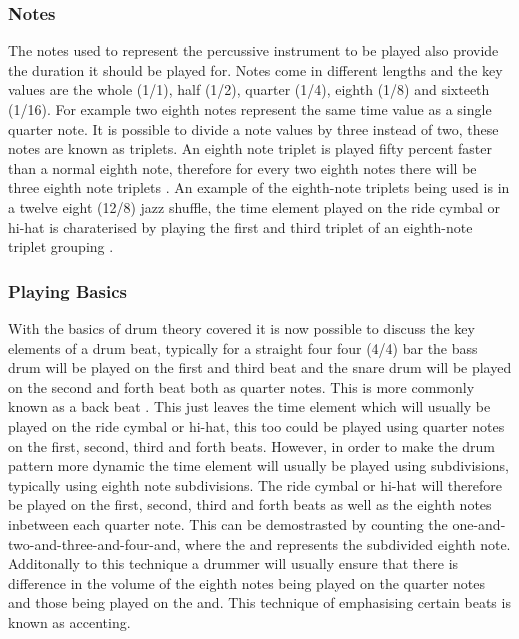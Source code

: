 \documentclass[a4paper, 11pt]{article}
\begin{document}
\subsubsection{Notes}
The notes used to represent the percussive instrument to be played also provide the duration it should be played for. Notes come in different lengths and the key values are the whole (1/1), half (1/2), quarter (1/4), eighth (1/8) and sixteeth (1/16). For example two eighth notes represent the same time value as a single quarter note. It is possible to divide a note values by three instead of two, these notes are known as triplets. An eighth note triplet is played fifty percent faster than a normal eighth note, therefore for every two eighth notes there will be three eighth note triplets \cite{drum-note}. An example of the eighth-note triplets being used is in a twelve eight (12/8) jazz shuffle, the time element played on the ride cymbal or hi-hat is charaterised by playing the first and third triplet of an eighth-note triplet grouping \cite{drum-bible}.

\subsubsection{Playing Basics}
With the basics of drum theory covered it is now possible to discuss the key elements of a drum beat, typically for a straight four four (4/4) bar the bass drum will be played on the first and third beat and the snare drum will be played on the second and forth beat both as quarter notes. This is more commonly known as a back beat \cite{drum-bible}. This just leaves the time element which will usually be played on the ride cymbal or hi-hat, this too could be played using quarter notes on the first, second, third and forth beats. However, in order to make the drum pattern more dynamic the time element will usually be played using subdivisions, typically using eighth note subdivisions. The ride cymbal or hi-hat will therefore be played on the first, second, third and forth beats as well as the eighth notes inbetween each quarter note. This can be demostrasted by counting the one-and-two-and-three-and-four-and, where the and represents the subdivided eighth note. Additonally to this technique a drummer will usually ensure that there is difference in the volume of the eighth notes being played on the quarter notes and those being played on the and. This technique of emphasising certain beats is known as accenting. 
\end{document}
